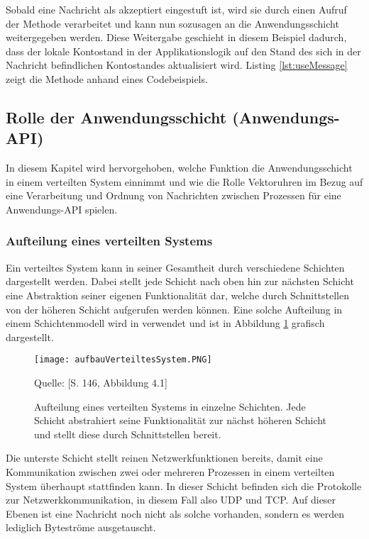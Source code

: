 Sobald eine Nachricht als akzeptiert eingestuft ist, wird sie durch einen Aufruf der Methode  verarbeitet und kann nun sozusagen an die Anwendungsschicht weitergegeben werden. Diese Weitergabe geschieht in diesem Beispiel dadurch, dass der lokale Kontostand in der Applikationslogik auf den Stand des sich in der Nachricht befindlichen Kontostandes aktualisiert wird. Listing \ref{lst:useMessage} zeigt die Methode anhand eines Codebeispiels.

\FloatBarrier

\subsection{Rolle der Anwendungsschicht (Anwendungs-API)}
\label{RolleDerAnwendung}
In diesem Kapitel wird hervorgehoben, welche Funktion die Anwendungsschicht in einem verteilten System einnimmt und wie die Rolle Vektoruhren im Bezug auf eine Verarbeitung und Ordnung von Nachrichten zwischen Prozessen für eine Anwendungs-API spielen.

\subsubsection{Aufteilung eines verteilten Systems}
Ein verteiltes System kann in seiner Gesamtheit durch verschiedene Schichten dargestellt werden. Dabei stellt jede Schicht nach oben hin zur nächsten Schicht eine Abstraktion seiner eigenen Funktionalität dar, welche durch Schnittstellen von der höheren Schicht aufgerufen werden können. Eine solche Aufteilung in einem Schichtenmodell wird in \cite{Coulouris2011} verwendet und ist in Abbildung \ref{figure:schichtenaufbau} grafisch dargestellt.

 \begin{figure}[ht]
 	\centering
 	\texttt{[image: aufbauVerteiltesSystem.PNG]}
 	\caption[Verteiltes System als Schichtemodell]{Aufteilung eines verteilten Systems in einzelne Schichten. Jede Schicht abstrahiert seine Funktionalität zur nächst höheren Schicht und stellt diese durch Schnittstellen bereit.}
 	Quelle: \cite{Coulouris2011}[S. 146, Abbildung 4.1]
 	\label{figure:schichtenaufbau}
 \end{figure}
 \FloatBarrier
 
 Die unterste Schicht stellt reinen Netzwerkfunktionen bereits, damit eine Kommunikation zwischen zwei oder mehreren Prozessen in einem verteilten System überhaupt stattfinden kann. In dieser Schicht befinden sich die Protokolle zur Netzwerkkommunikation, in diesem Fall also UDP und TCP. Auf dieser Ebenen ist eine Nachricht noch nicht als solche vorhanden, sondern es werden lediglich Byteströme ausgetauscht.
 
